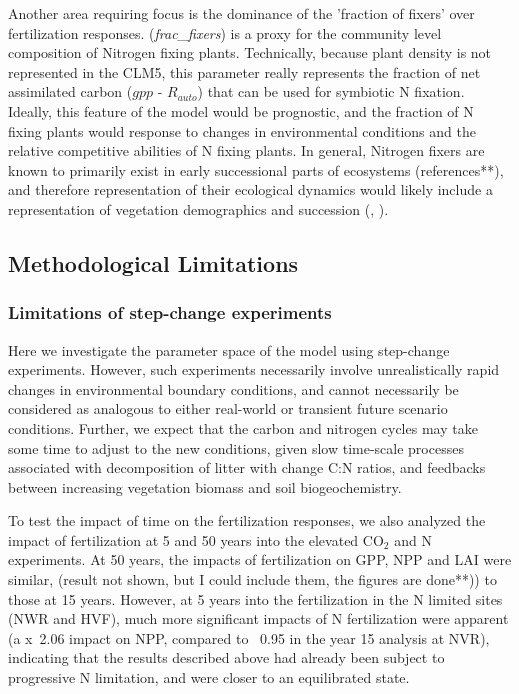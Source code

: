 \documentclass[draft,linenumbers]{agujournal}
\begin{document}
Another area requiring focus is the dominance of the 'fraction of fixers' over fertilization responses.  (\emph{frac\_fixers}) is a proxy for the community level composition of Nitrogen fixing plants. Technically, because plant density is not represented in the CLM5, this parameter really represents the fraction of net assimilated carbon ($gpp$ - $R_{auto}$) that can be used for symbiotic N fixation. Ideally, this feature of the model would be prognostic, and the fraction of N fixing plants would response to changes in environmental conditions and the relative competitive abilities of N fixing plants. In general, Nitrogen fixers are known to primarily exist in early successional parts of ecosystems (references**), and therefore representation of their ecological dynamics would likely include a representation of vegetation demographics and succession (\cite{fisher2018vegetation}, \cite{trugman2016climate}).

\subsection{ Methodological Limitations}

\subsubsection{Limitations of step-change experiments}
Here we investigate the parameter space of the model using step-change experiments. However, such experiments necessarily involve unrealistically rapid changes in environmental boundary conditions, and cannot necessarily be considered as analogous to either real-world or transient future scenario conditions. Further, we expect that the carbon and nitrogen cycles may take some time to adjust to the new conditions, given slow time-scale processes associated with decomposition of litter with change C:N ratios, and feedbacks between increasing vegetation biomass and soil biogeochemistry.

To test the impact of time on the fertilization responses, we also analyzed the impact of fertilization at 5 and 50 years into the elevated CO$_{2}$ and N experiments. At 50 years, the impacts of fertilization on GPP, NPP and LAI were similar, (result not shown, but I could include them, the figures are done**)) to those at 15 years.  However, at 5 years into the fertilization in the N limited sites (NWR and HVF), much more significant impacts of N fertilization were apparent (a x~2.06 impact on NPP, compared to ~0.95 in the year 15 analysis at NVR), indicating that the results described above had already been subject to progressive N limitation, and were closer to an equilibrated state.
\end{document}
